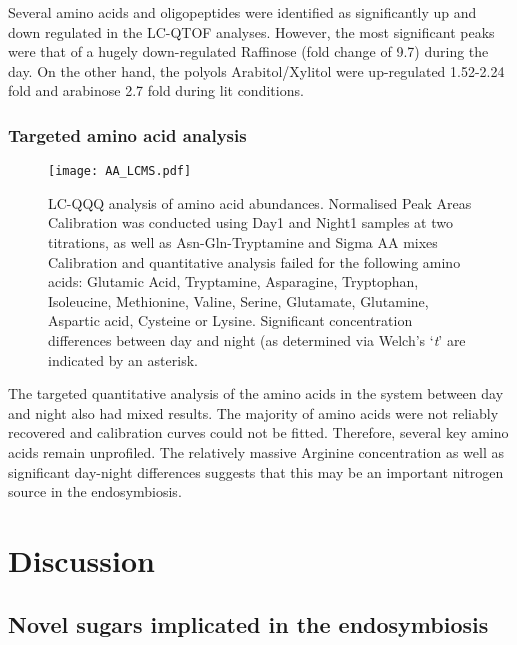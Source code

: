 Several amino acids and oligopeptides were identified as significantly
up and down regulated in the LC-QTOF analyses. However,
the most significant peaks were that of a hugely down-regulated
Raffinose (fold change of 9.7) during the day.  
On the other hand, the polyols Arabitol/Xylitol were up-regulated 1.52-2.24 fold
and arabinose 2.7 fold during lit conditions.
%
%


\subsubsection{Targeted amino acid analysis}

\begin{figure}
    \texttt{[image: AA\_LCMS.pdf]}
    \caption[LC-QQQ Quantitative Analysis of Amino Acids]{LC-QQQ analysis
        of amino acid abundances. Normalised Peak Areas 
        Calibration was conducted using Day1 and Night1 samples at two titrations, as well as Asn-Gln-Tryptamine and Sigma AA mixes
    Calibration and quantitative analysis failed for the following amino acids: 
Glutamic Acid, Tryptamine, Asparagine, Tryptophan, Isoleucine, Methionine, Valine, Serine, Glutamate, Glutamine, Aspartic acid, Cysteine or Lysine.
Significant concentration differences between day and night (as determined via Welch's `\textit{t}' are indicated by an asterisk.}
    \label{fig:amino_acids}
\end{figure}

The targeted quantitative analysis of the amino acids in the system
between day and night also had mixed results.  The majority of amino
acids were not reliably recovered and calibration curves could not be fitted.
Therefore, several key amino acids remain unprofiled.
The relatively massive Arginine concentration as well as significant
day-night differences suggests that this may be an important nitrogen
source in the endosymbiosis.


\section{Discussion}

\subsection{Novel sugars implicated in the endosymbiosis}

